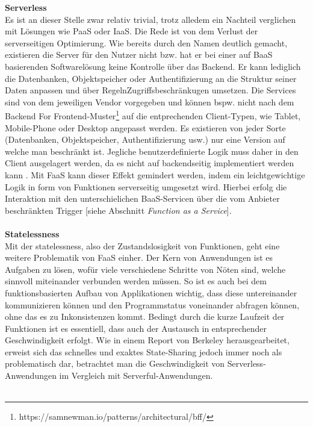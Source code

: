 \documentclass[11pt]{article}
\begin{document}
\glqq \textbf{Serverless}\grqq{}\\
Es ist an dieser Stelle zwar relativ trivial, trotz alledem ein Nachteil verglichen mit Lösungen wie PaaS oder IaaS. Die Rede ist von dem Verlust der serverseitigen Optimierung. Wie bereits durch den Namen deutlich gemacht, existieren die Server für den Nutzer nicht bzw. hat er bei einer auf BaaS basierenden Softwarelösung keine Kontrolle über das Backend. Er kann lediglich die Datenbanken, Objektspeicher oder Authentifizierung an die Struktur seiner Daten anpassen und über \glqq Regeln\grqq{}Zugriffsbeschränkugen umsetzen. Die Services sind von dem jeweiligen Vendor vorgegeben und können bspw. nicht nach dem \glqq Backend For Frontend\grqq{}-Muster\footnote{https://samnewman.io/patterns/architectural/bff/} auf die entprechenden Client-Typen, wie Tablet, Mobile-Phone oder Desktop angepasst werden. Es existieren von jeder Sorte (Datenbanken, Objektspeicher, Authentifizierung usw.) nur eine Version auf welche man beschränkt ist. Jegliche benutzerdefinierte Logik muss daher in den Client ausgelagert werden, da es nicht auf backendseitig implementiert werden kann \cite{fowler2018serverless}. Mit FaaS kann dieser Effekt gemindert werden, indem ein leichtgewichtige Logik in form von Funktionen serverseitig umgesetzt wird. Hierbei erfolg die Interaktion mit den unterschielichen BaaS-Servicen über die vom Anbieter beschränkten Trigger [siehe Abschnitt \textit{Function as a Service}]. \\\\
\glqq \textbf{Statelessness}\grqq{}\\
Mit der \glqq statelessness\grqq{}, also der Zustandslosigkeit von Funktionen, geht eine weitere Problematik von FaaS einher. Der Kern von Anwendungen ist es Aufgaben zu lösen, wofür viele verschiedene Schritte von Nöten sind, welche sinnvoll miteinander verbunden werden müssen. So ist es auch bei dem funktionsbasierten Aufbau von Applikationen wichtig, dass diese untereinander kommunizieren können und den Programmstatus voneinander abfragen können, ohne das es zu Inkonsistenzen kommt. Bedingt durch die kurze Laufzeit der Funktionen ist es essentiell, dass auch der Austausch in entsprechender Geschwindigkeit erfolgt. Wie in einem Report von Berkeley \cite{jonas2019cloud} herausgearbeitet, erweist sich das schnelles und exaktes \glqq State-Sharing\grqq{} jedoch immer noch als problematisch dar, betrachtet man die Geschwindigkeit von \glqq Serverless\grqq{}-Anwendungen im Vergleich mit \glqq Serverful\grqq{}-Anwendungen. \\\\
\end{document}
